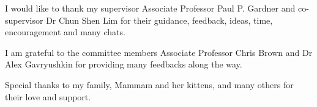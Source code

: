\begin{acknowledgements}
I would like to thank my supervisor Associate Professor Paul P. Gardner and  co-supervisor Dr Chun Shen Lim for their guidance, feedback, ideas, time, encouragement and many chats. 

I am grateful to the committee members Associate Professor Chris Brown and Dr Alex Gavryushkin for providing many feedbacks along the way. 


Special thanks to my family, Mammam and her kittens, and many others for their love and support.

\end{acknowledgements}
